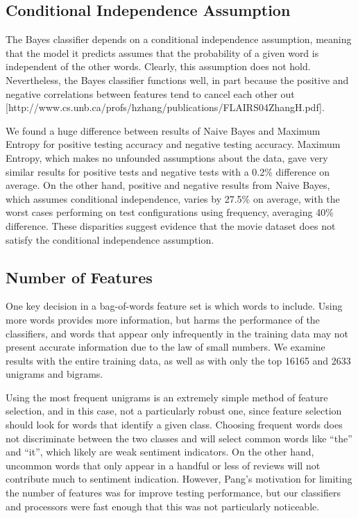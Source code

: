 \documentclass[10pt,twocolumn,letterpaper]{article}
\begin{document}
\subsection{Conditional Independence Assumption}

The Bayes classifier depends on a conditional independence assumption, meaning that the model it predicts assumes that the probability of a given word is independent of the other words. Clearly, this assumption does not hold. Nevertheless, the Bayes classifier functions well, in part because the positive and negative correlations between features tend to cancel each other out [http://www.cs.unb.ca/profs/hzhang/publications/FLAIRS04ZhangH.pdf].

We found a huge difference between results of Naive Bayes and Maximum Entropy for positive testing accuracy and negative testing accuracy. Maximum Entropy, which makes no unfounded assumptions about the data, gave very similar results for positive tests and negative tests with a 0.2\% difference on average. On the other hand, positive and negative results from Naive Bayes, which assumes conditional independence, varies by 27.5\% on average, with the worst cases performing on test configurations using frequency, averaging 40\% difference. These disparities suggest evidence that the movie dataset does not satisfy the conditional independence assumption.

\subsection{Number of Features}

One key decision in a bag-of-words feature set is which words to include. Using more words provides more information, but harms the performance of the classifiers, and words that appear only infrequently in the training data may not present accurate information due to the law of small numbers. We examine results with the entire training data, as well as with only the top 16165 and 2633 unigrams and bigrams.

Using the most frequent unigrams is an extremely simple method of feature selection, and in this case, not a particularly robust one, since feature selection should look for words that identify a given class. Choosing frequent words does not discriminate between the two classes and will select common words like ``the'' and ``it'', which likely are weak sentiment indicators. On the other hand, uncommon words that only appear in a handful or less of reviews will not contribute much to sentiment indication. However, Pang’s motivation for limiting the number of features was for improve testing performance, but our classifiers and processors were fast enough that this was not particularly noticeable.
\end{document}
